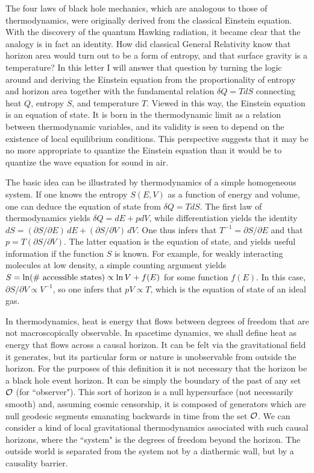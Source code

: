 The four laws of black hole mechanics, which are analogous to those
of thermodynamics, were originally
derived from the classical Einstein equation\cite{barcarhaw}.
With the discovery of the quantum Hawking radiation\cite{hrad},
it became clear that the analogy is in fact an identity.
How did classical General Relativity know that horizon area
would turn out to be a form of entropy, and that surface gravity
is a temperature? In this letter I
will answer that question by turning the logic around
and deriving the Einstein equation
from the proportionality of entropy and horizon
area together with the
fundamental relation $\delta Q=TdS$
connecting heat $Q$, entropy $S$, and temperature $T$.
Viewed in this way,
the Einstein equation is an equation of state. It is
born in the thermodynamic limit as a relation between thermodynamic
variables, and its validity is seen to depend on the existence of
local equilibrium conditions.
This perspective suggests that it may be no more
appropriate to quantize the Einstein equation than
it would be to quantize the wave equation for sound
in air.

The basic idea can be illustrated by thermodynamics
of a simple homogeneous system. If one knows the entropy
$S(E,V)$ as a function of energy and volume,
one can deduce the equation of state from
$\delta Q=T dS$. The first law of thermodynamics
yields $\delta Q=dE+pdV$, while differentiation yields
the identity
$dS=(\partial S/\partial E)\, dE + (\partial S/\partial V)\, dV$.
One thus infers that $T^{-1}=\partial S/\partial E$ and
that $p=T(\partial S/\partial V)$. The latter equation is the
equation of state, and yields useful information if the
function $S$ is known. For example, for weakly interacting
molecules at low density, a simple counting argument yields
$S=\ln(\# {\rm ~accessible~states})\propto \ln V + f(E)$ for some
function $f(E)$. In this case, $\partial S/\partial V\propto V^{-1}$,
so one infers that $pV\propto T$, which is the equation of state
of an ideal gas.

In thermodynamics, heat is energy that flows between degrees
of freedom that are not macroscopically observable.
In spacetime dynamics, we shall define
heat as energy that flows across a causal horizon. It can be felt
via the gravitational field it generates, but its particular form
or nature is unobservable from outside the horizon.
For the purposes of this definition
it is not necessary that the horizon be a black hole event
horizon. It can be simply the boundary of the past of any
set ${\cal O}$  (for ``observer").
This sort of horizon is a null hypersurface
(not necessarily smooth) and, assuming cosmic censorship, it is
composed of generators which are
null geodesic segments emanating backwards in time
from the set ${\cal O}$.
We can consider a kind of local gravitational
thermodynamics associated with such causal
horizons, where the ``system"
is the degrees of freedom beyond the horizon.
The outside world is separated from the system not by a
diathermic wall, but by a causality barrier.

